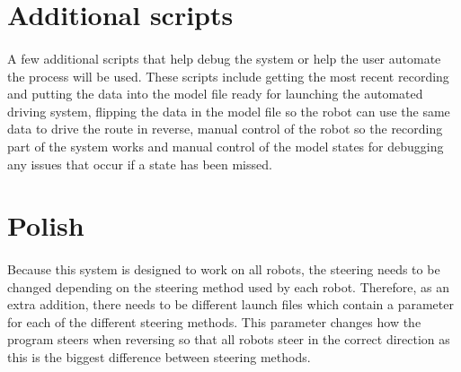 \section{Additional scripts}
\paragraph{}
A few additional scripts that help debug the system or help the user automate the process will be used. These scripts include getting the most recent recording and putting the data into the model file ready for launching the automated driving system, flipping the data in the model file so the robot can use the same data to drive the route in reverse, manual control of the robot so the recording part of the system works and manual control of the model states for debugging any issues that occur if a state has been missed.

\section{Polish}
\paragraph{}
Because this system is designed to work on all robots, the steering needs to be changed depending on the steering method used by each robot. Therefore, as an extra addition, there needs to be different launch files which contain a parameter for each of the different steering methods. This parameter changes how the program steers when reversing so that all robots steer in the correct direction as this is the biggest difference between steering methods.


